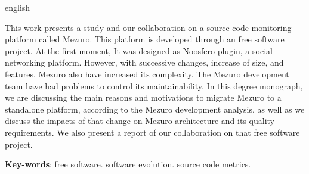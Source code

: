 \begin{resumo}[Abstract]
  \begin{otherlanguage*}{english} 
  
This work presents a study and our collaboration on a source code monitoring platform called Mezuro. This platform is developed through an free software project. At the first moment, It was designed as Noosfero plugin, a social networking platform.
%
However, with successive changes, increase of size, and features, Mezuro also have increased its complexity. The Mezuro development team have had problems to control its maintainability.
%
In this degree monograph, we are discussing the main reasons and motivations to migrate Mezuro to a standalone platform, according to the Mezuro development analysis, as well as we discuss the impacts of that change on Mezuro architecture and its quality requirements.
%
We also present a report of our collaboration on that free software project.
  
  \vspace{\onelineskip}
 
  \noindent 
  \textbf{Key-words}: free software. software evolution. source code metrics.
  \end{otherlanguage*}
\end{resumo}


